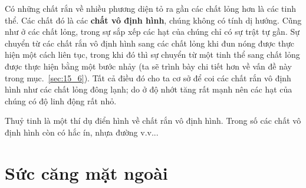 
Có những chất rắn về nhiều phương diện tỏ ra gần các chất lỏng hơn là các tinh thể. Các chất đó là các \textbf{chất vô định hình}, chúng không có tính dị hướng. Cũng như ở các chất lỏng, trong sự sắp xếp các hạt của chúng chỉ có sự trật tự gần. Sự chuyển từ các chất rắn vô định hình sang các chất lỏng khi đun nóng được thực hiện một cách liên tục, trong khi đó thì sự chuyển từ một tinh thể sang chất lỏng được thực hiện bằng một bước nhảy (ta sẽ trình bày chi tiết hơn về vấn đề này trong mục.~\ref{sec:15_6}). Tất cả điều đó cho ta cơ sở để coi các chất rắn vô định hình như các chất lỏng đông lạnh; do ở độ nhớt tăng rất mạnh nên các hạt của chúng có độ linh động rất nhỏ. 


Thuỷ tinh là một thí dụ điển hình về chất rắn vô định hình. Trong số các chất vô định hình còn có hắc ín, nhựa đường v.v...


\section{Sức căng mặt ngoài}\label{sec:14_2}


